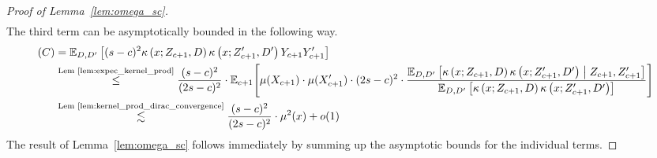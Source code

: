 \begin{proof}[Proof of Lemma~\ref{lem:omega_sc}]
\begin{equation}
\begin{aligned}
		\end{aligned}
	\end{equation}
	The third term can be asymptotically bounded in the following way.
	\begin{equation}
		\begin{aligned}
			(C)
            & = \mathbb{E}_{D, D^{\prime}}\left[(s-c)^2 \kappa\left(x; Z_{c+1}, D\right)\kappa\left(x; Z_{c+1}^{\prime}, D^{\prime}\right)Y_{c+1}Y_{c+1}^{\prime}\right]                                           \\
			& \overset{\text{Lem \ref{lem:expec_kernel_prod}}}{\leq} \frac{(s-c)^{2}}{(2s-c)^2} 
            \cdot \mathbb{E}_{c+1}\Bigg[
                \mu(X_{c+1}) \cdot \mu(X_{c+1}^{\prime}) \cdot (2s-c)^2 
                \cdot \frac{\mathbb{E}_{D, D^{\prime}}\left[\kappa\left(x; Z_{c+1}, D\right)\kappa\left(x; Z_{c+1}^{\prime}, D^{\prime}\right) \; \middle| \; Z_{c+1}, Z_{c+1}^{\prime}\right]}{\mathbb{E}_{D, D^{\prime}}\left[\kappa\left(x; Z_{c+1}, D\right)\kappa\left(x; Z_{c+1}^{\prime}, D^{\prime}\right)\right]}
            \Bigg]\\
			& \overset{\text{Lem \ref{lem:kernel_prod_dirac_convergence}}}{\lesssim}
            \frac{(s-c)^{2}}{(2s-c)^2} \cdot \mu^2(x) + o(1)
		\end{aligned}
	\end{equation}
	The result of Lemma~\ref{lem:omega_sc} follows immediately by summing up the asymptotic bounds for the individual terms.
\end{proof}

